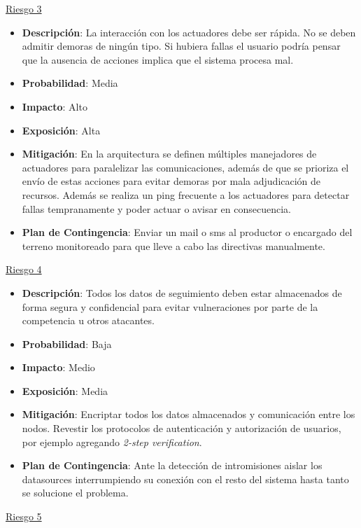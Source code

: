\underline{Riesgo 3}
\begin{itemize} \itemsep -2pt
    \item \textbf{Descripción}: La interacción con los actuadores debe ser rápida. No se deben admitir demoras de ningún tipo. Si hubiera fallas el usuario podría pensar que la ausencia de acciones implica que el sistema procesa mal.
    \item \textbf{Probabilidad}: Media 
    \item \textbf{Impacto}: Alto
    \item \textbf{Exposición}: Alta
    \item \textbf{Mitigación}: En la arquitectura se definen múltiples manejadores de actuadores para paralelizar las comunicaciones, además de que se prioriza el envío de estas acciones para evitar demoras por mala adjudicación de recursos. Además se realiza un ping frecuente a los actuadores para detectar fallas tempranamente y poder actuar o avisar en consecuencia.
    \item \textbf{Plan de Contingencia}: Enviar un mail o sms al productor o encargado del terreno monitoreado para que lleve a cabo las directivas manualmente.
\end{itemize}

\underline{Riesgo 4}

\begin{itemize} \itemsep -2pt
    \item \textbf{Descripción}: Todos los datos de seguimiento deben estar almacenados de forma segura y confidencial para evitar vulneraciones por parte de la competencia u otros atacantes.
    \item \textbf{Probabilidad}: Baja
    \item \textbf{Impacto}: Medio
    \item \textbf{Exposición}: Media
    \item \textbf{Mitigación}: Encriptar todos los datos almacenados y comunicación entre los nodos. Revestir los protocolos de autenticación y autorización de usuarios, por ejemplo agregando \textit{2-step verification}.
    \item \textbf{Plan de Contingencia}: Ante la detección de intromisiones aislar los datasources interrumpiendo su conexión con el resto del sistema hasta tanto se solucione el problema.
\end{itemize}

\underline{Riesgo 5}

